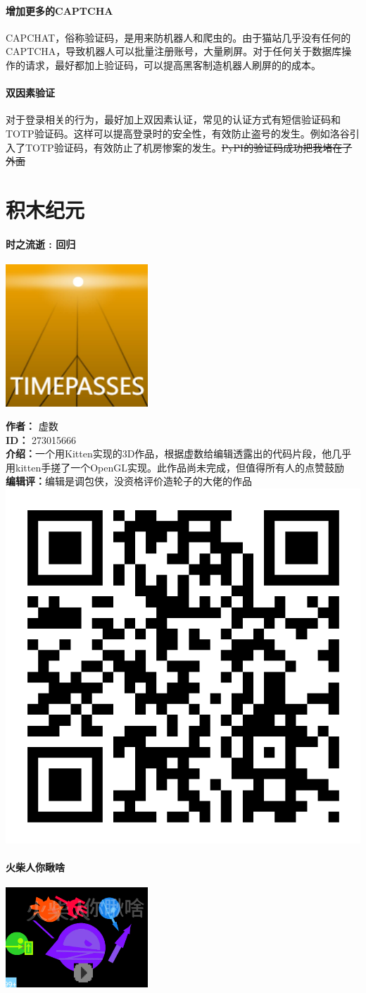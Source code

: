\documentclass[UTF8]{ctexart}
\begin{document}
\subsection{增加更多的CAPTCHA}
CAPCHAT，俗称验证码，是用来防机器人和爬虫的。由于猫站几乎没有任何的CAPTCHA，导致机器人可以批量注册账号，大量刷屏。对于任何关于数据库操作的请求，最好都加上验证码，可以提高黑客制造机器人刷屏的的成本。
\subsection{双因素验证}
对于登录相关的行为，最好加上双因素认证，常见的认证方式有短信验证码和TOTP验证码。这样可以提高登录时的安全性，有效防止盗号的发生。例如洛谷引入了TOTP验证码，有效防止了机房惨案的发生。\sout{PyPI的验证码成功把我堵在了外面}
\pagebreak

\part{积木纪元}
\subsection{时之流逝 : 回归}
\includegraphics[width=0.4\textwidth]{assets/02/kitten-1.png}

\noindent
\textbf{作者：} 虚数\\
\textbf{ID：} 273015666\\
\textbf{介绍：}一个用Kitten实现的3D作品，根据虚数给编辑透露出的代码片段，他几乎用kitten手搓了一个OpenGL实现。此作品尚未完成，但值得所有人的点赞鼓励 \\
\textbf{编辑评：}编辑是调包侠，没资格评价造轮子的大佬的作品
\hfill\includegraphics[width=0.08\columnwidth]{assets/02/kitten-1-qrc.png}
\subsection{火柴人你瞅啥}
\includegraphics[width=0.4\textwidth]{assets/02/kitten-2.png}
\end{document}
